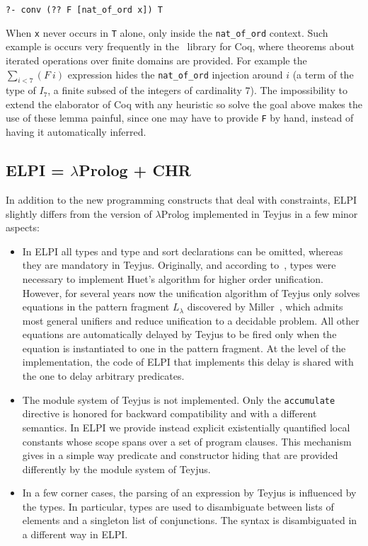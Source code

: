 \documentclass{easychair}
\begin{document}
\begin{Verbatim}
?- conv (?? F [nat_of_ord x]) T
\end{Verbatim}

When \verb+x+ never occurs in \verb+T+ alone, only inside the
\verb+nat_of_ord+ context.  Such example is occurs very frequently
in the~\cite{bigop} library for Coq, where theorems about iterated
operations over finite domains are provided.
For example the $\sum_{i < 7} (F~i)$ expression hides
the \verb+nat_of_ord+ injection around $i$ (a term of the
type of $I_7$, a finite subsed of the integers of cardinality $7$).
The impossibility to extend the elaborator of Coq with any heuristic
so solve the goal above makes the use of these lemma painful, since
one may have to provide \verb+F+ by hand, instead of having it
automatically inferred.

\subsection{ELPI = $\lambda$Prolog + CHR}\label{sec:elpi}

In addition to the new programming constructs that deal with
constraints, ELPI slightly differs from the version of $\lambda$Prolog
implemented in Teyjus in a few minor aspects:
\begin{itemize}
\item In ELPI all types and type and sort declarations can be omitted, whereas
	they are mandatory in Teyjus. Originally, and according
	to~\cite{jlp98}, types were necessary to implement Huet's algorithm for
	higher order unification. However, for several years now the
	unification algorithm of Teyjus only solves equations in the pattern
	fragment $L_\lambda$ discovered by Miller~\cite{patternfrag}, which admits most
	general unifiers and reduce unification to a decidable problem. All
	other equations are automatically delayed by Teyjus to be fired only
	when the equation is instantiated to one in the pattern fragment. At
	the level of the implementation, the code of ELPI that implements this
	delay is shared with the one to delay arbitrary predicates.
\item The module system of Teyjus is not implemented. Only the
	\verb+accumulate+ directive is honored for backward compatibility and
	with a different semantics. In ELPI we provide instead explicit
	existentially quantified local constants whose scope spans over a set
	of program clauses. This mechanism gives in a simple way predicate and
	constructor hiding that are provided differently by the module system
	of Teyjus.
\item In a few corner cases, the parsing of an expression by Teyjus is
	influenced by the types. In particular, types are used to disambiguate
	between lists of elements and a singleton list of conjunctions. The
	syntax is disambiguated in a different way in ELPI.
\end{itemize}
\end{document}
